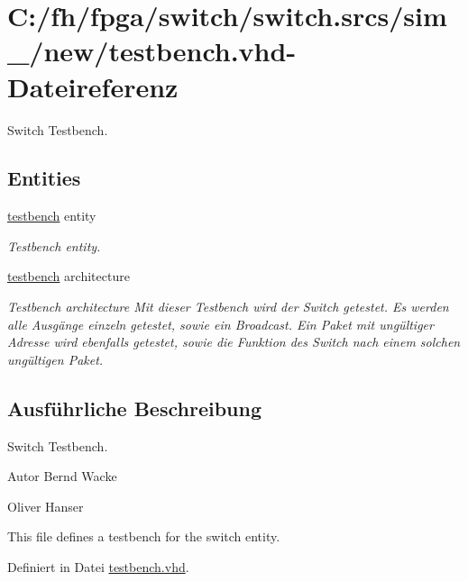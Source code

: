 \hypertarget{testbench_8vhd}{}\section{C\+:/fh/fpga/switch/switch.srcs/sim\+\_/new/testbench.vhd-\/\+Dateireferenz}
\label{testbench_8vhd}


Switch Testbench.  


\subsection*{Entities}
\begin{DoxyCompactItemize}
\item 
\mbox{\hyperlink{classtestbench}{testbench}} entity
\begin{DoxyCompactList}\small\item\em Testbench entity. \end{DoxyCompactList}\item 
\mbox{\hyperlink{classtestbench_1_1testbench}{testbench}} architecture
\begin{DoxyCompactList}\small\item\em Testbench architecture Mit dieser Testbench wird der Switch getestet. Es werden alle Ausgänge einzeln getestet, sowie ein Broadcast. Ein Paket mit ungültiger Adresse wird ebenfalls getestet, sowie die Funktion des Switch nach einem solchen ungültigen Paket. \end{DoxyCompactList}\end{DoxyCompactItemize}


\subsection{Ausführliche Beschreibung}
Switch Testbench. 

\begin{DoxyAuthor}{Autor}
Bernd Wacke 

Oliver Hanser
\end{DoxyAuthor}
This file defines a testbench for the switch entity. 

Definiert in Datei \mbox{\hyperlink{testbench_8vhd_source}{testbench.\+vhd}}.

